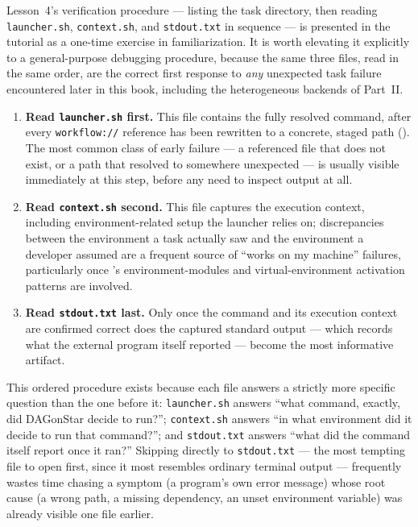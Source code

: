 Lesson~4's verification procedure --- listing the task directory, then
reading \texttt{launcher.sh}, \texttt{context.sh}, and \texttt{stdout.txt}
in sequence --- is presented in the tutorial as a one-time exercise in
familiarization. It is worth elevating it explicitly to a general-purpose
debugging procedure, because the same three files, read in the same order,
are the correct first response to \emph{any} unexpected task failure
encountered later in this book, including the heterogeneous backends of
Part~II.

\begin{enumerate}[leftmargin=1.8em]
  \item \textbf{Read \texttt{launcher.sh} first.} This file contains the
    fully resolved command, after every \texttt{workflow://} reference has
    been rewritten to a concrete, staged path (). The most
    common class of early failure --- a referenced file that does not
    exist, or a path that resolved to somewhere unexpected --- is usually
    visible immediately at this step, before any need to inspect output at
    all.
  \item \textbf{Read \texttt{context.sh} second.} This file captures the
    execution context, including environment-related setup the launcher
    relies on; discrepancies between the environment a task actually saw
    and the environment a developer assumed are a frequent source of
    ``works on my machine'' failures, particularly once
    's environment-modules and virtual-environment
    activation patterns are involved.
  \item \textbf{Read \texttt{stdout.txt} last.} Only once the command and
    its execution context are confirmed correct does the captured standard
    output --- which records what the external program itself reported ---
    become the most informative artifact.
\end{enumerate}

\begin{practicebox}
This ordered procedure exists because each file answers a strictly more
specific question than the one before it: \texttt{launcher.sh} answers
``what command, exactly, did DAGonStar decide to run?''; \texttt{context.sh}
answers ``in what environment did it decide to run that command?''; and
\texttt{stdout.txt} answers ``what did the command itself report once it
ran?'' Skipping directly to \texttt{stdout.txt} --- the most tempting file to
open first, since it most resembles ordinary terminal output --- frequently
wastes time chasing a symptom (a program's own error message) whose root
cause (a wrong path, a missing dependency, an unset environment variable)
was already visible one file earlier.
\end{practicebox}


